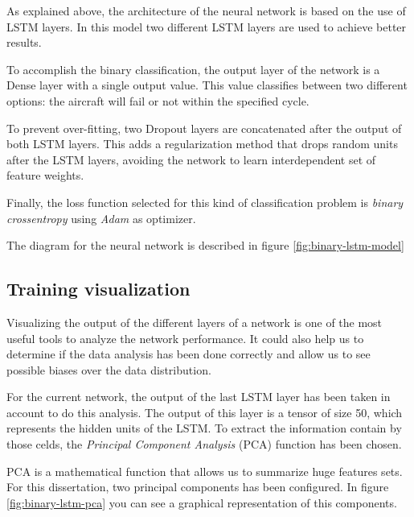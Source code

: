 As explained above, the architecture of the neural network is based on the use of LSTM layers. In this model two different LSTM layers are used to achieve better results.

To accomplish the binary classification, the output layer of the network is a Dense layer with a single output value. This value classifies between two different options: the aircraft will fail or not within the specified cycle.

To prevent over-fitting, two Dropout layers are concatenated after the output of both LSTM layers. This adds a regularization method that drops random units after the LSTM layers, avoiding the network to learn interdependent set of feature weights.

Finally, the loss function selected for this kind of classification problem is \textit{binary crossentropy} using \textit{Adam} as optimizer.

The diagram for the neural network is described in figure \ref{fig:binary-lstm-model}


\subsection{Training visualization}

Visualizing the output of the different layers of a network is one of the most useful tools to analyze the network performance. It could also help us to determine if the data analysis has been done correctly and allow us to see possible biases over the data distribution.

For the current network, the output of the last LSTM layer has been taken in account to do this analysis. The output of this layer is a tensor of size 50, which represents the hidden units of the LSTM. To extract the information contain by those celds, the \textit{Principal Component Analysis} (PCA) function has been chosen.

PCA is a mathematical function that allows us to summarize huge features sets. For this dissertation, two principal components has been configured. In figure \ref{fig:binary-lstm-pca} you can see a graphical representation of this components.

